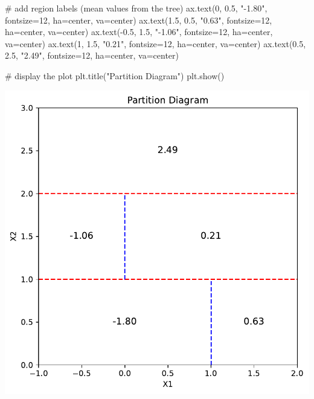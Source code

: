 \documentclass[
  letterpaper,
  DIV=11,
  numbers=noendperiod]{scrartcl}
\newenvironment{Shaded}{\begin{snugshade}}{\end{snugshade}}
\newcommand{\CommentTok}[1]{\textcolor[rgb]{0.37,0.37,0.37}{#1}}
\newcommand{\DecValTok}[1]{\textcolor[rgb]{0.68,0.00,0.00}{#1}}
\newcommand{\FloatTok}[1]{\textcolor[rgb]{0.68,0.00,0.00}{#1}}
\newcommand{\NormalTok}[1]{\textcolor[rgb]{0.00,0.23,0.31}{#1}}
\newcommand{\OperatorTok}[1]{\textcolor[rgb]{0.37,0.37,0.37}{#1}}
\newcommand{\StringTok}[1]{\textcolor[rgb]{0.13,0.47,0.30}{#1}}
\begin{document}
\begin{Shaded}
\begin{Highlighting}[]
\CommentTok{\# add region labels (mean values from the tree)}
\NormalTok{ax.text(}\DecValTok{0}\NormalTok{, }\FloatTok{0.5}\NormalTok{, }\StringTok{"{-}1.80"}\NormalTok{, fontsize}\OperatorTok{=}\DecValTok{12}\NormalTok{, ha}\OperatorTok{=}\StringTok{\textquotesingle{}center\textquotesingle{}}\NormalTok{, va}\OperatorTok{=}\StringTok{\textquotesingle{}center\textquotesingle{}}\NormalTok{)}
\NormalTok{ax.text(}\FloatTok{1.5}\NormalTok{, }\FloatTok{0.5}\NormalTok{, }\StringTok{"0.63"}\NormalTok{, fontsize}\OperatorTok{=}\DecValTok{12}\NormalTok{, ha}\OperatorTok{=}\StringTok{\textquotesingle{}center\textquotesingle{}}\NormalTok{, va}\OperatorTok{=}\StringTok{\textquotesingle{}center\textquotesingle{}}\NormalTok{)}
\NormalTok{ax.text(}\OperatorTok{{-}}\FloatTok{0.5}\NormalTok{, }\FloatTok{1.5}\NormalTok{, }\StringTok{"{-}1.06"}\NormalTok{, fontsize}\OperatorTok{=}\DecValTok{12}\NormalTok{, ha}\OperatorTok{=}\StringTok{\textquotesingle{}center\textquotesingle{}}\NormalTok{, va}\OperatorTok{=}\StringTok{\textquotesingle{}center\textquotesingle{}}\NormalTok{)}
\NormalTok{ax.text(}\DecValTok{1}\NormalTok{, }\FloatTok{1.5}\NormalTok{, }\StringTok{"0.21"}\NormalTok{, fontsize}\OperatorTok{=}\DecValTok{12}\NormalTok{, ha}\OperatorTok{=}\StringTok{\textquotesingle{}center\textquotesingle{}}\NormalTok{, va}\OperatorTok{=}\StringTok{\textquotesingle{}center\textquotesingle{}}\NormalTok{)}
\NormalTok{ax.text(}\FloatTok{0.5}\NormalTok{, }\FloatTok{2.5}\NormalTok{, }\StringTok{"2.49"}\NormalTok{, fontsize}\OperatorTok{=}\DecValTok{12}\NormalTok{, ha}\OperatorTok{=}\StringTok{\textquotesingle{}center\textquotesingle{}}\NormalTok{, va}\OperatorTok{=}\StringTok{\textquotesingle{}center\textquotesingle{}}\NormalTok{)}

\CommentTok{\# display the plot}
\NormalTok{plt.title(}\StringTok{"Partition Diagram"}\NormalTok{)}
\NormalTok{plt.show()}
\end{Highlighting}
\end{Shaded}

\includegraphics{PS4_files/figure-pdf/cell-9-output-1.pdf}
\end{document}
